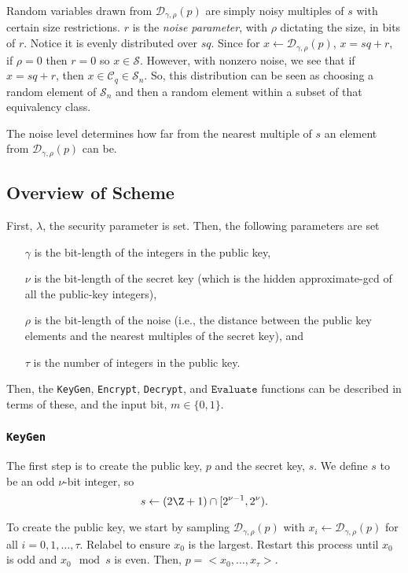 \documentclass[a4paper,11pt, oneside]{article}
\newcommand{\C}[1]{\mathcal{C}_{#1}}
\renewcommand{\D}{\mathcal{D}_{\gamma,\rho}(p)}
\newcommand{\ring}{\mathcal{S}}
\newcommand{\nring}{\mathcal{S}_n}
\begin{document}
Random variables drawn from $\D$ are simply noisy multiples of $s$ with certain size restrictions. $r$ is the \emph{noise parameter}, with $\rho$ dictating the size, in bits of $r$.  Notice it is evenly distributed over $sq$.  Since for $x\leftarrow\D$, $x = sq+r$, if $\rho = 0$ then $r = 0$ so $x\in\ring$.  However, with nonzero noise, we see that if $x = sq+r$, then $x\in\C{q}\in\nring$.  So, this distribution can be seen as choosing a random element of $\nring$ and then a random element within a subset of that equivalency class.  

The noise level determines how far from the nearest multiple of $s$ an element from $\D$ can be.

    \subsection{Overview of Scheme}\label{scheme}
    First, $\lambda$, the security parameter is set.  Then, the following parameters are set
\begin{itemize}
    \item[$\gamma$] is the bit-length of the integers in the public key, 
    \item[$\nu$] is the bit-length of the secret key (which is the hidden approximate-gcd of all the public-key integers), 
    \item[$\rho$] is the bit-length of the noise (i.e., the distance between the public key elements and the nearest multiples of the secret key), and 
    \item[$\tau$] is the number of integers in the public key.
\end{itemize}

Then, the \texttt{KeyGen}, \texttt{Encrypt}, \texttt{Decrypt}, and $\texttt{Evaluate}$ functions can be described in terms of these, and the input bit, $m\in\{0,1\}$.

\subsubsection{\texttt{KeyGen}}
The first step is to create the public key, $p$ and the secret key, $s$.  We define $s$ to be an odd $\nu$-bit integer, so
\[ s\leftarrow (2\Z + 1)\cap [2^{\nu - 1}, 2^\nu).\]


To create the public key, we start by sampling $\D$ with $x_i \leftarrow \D$ for all $i=0,1,\dots,\tau$.  Relabel to ensure $x_0$ is the largest.  Restart this process until $x_0$ is odd and $x_0\mod{s}$ is even.  Then, $p = <x_0,\dots,x_\tau>$.
    
\end{document}
